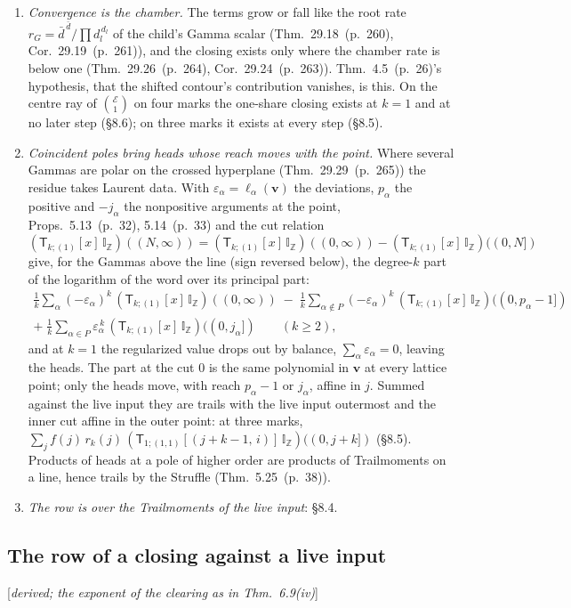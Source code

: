 \documentclass[11pt]{article}
\newcommand{\cE}{\mathcal E}
\newcommand{\sT}{\mathsf T}
\newcommand{\IZ}{\mathbb I_{\mathbb Z}}
\newcommand{\Tx}[3]{(\sT_{#1;(1)}[x]\,#2)((#3,\infty))}
\newcommand{\Th}[4]{(\sT_{#1;(1)}[x]\,#2)((#3,#4])}
\newcommand{\status}[1]{\hfill{\small[\textit{#1}]}}
\newcommand{\hb}[2]{#1~(p.~#2)}   %
\theoremstyle{plain}
\theoremstyle{remark}
\begin{document}
\begin{enumerate}[label=(\alph*)]
\item \emph{Convergence is the chamber.} The terms grow or fall like the root rate $r_G=\bar d^{\,\bar d}/\prod d_l^{\,d_l}$ of the child's Gamma scalar (Thm.~\hb{29.18}{260}, Cor.~\hb{29.19}{261}), and the closing exists only where the chamber rate is below one (Thm.~\hb{29.26}{264}, Cor.~\hb{29.24}{263}). Thm.~\hb{4.5}{26}'s hypothesis, that the shifted contour's contribution vanishes, is this. On the centre ray of $\binom{\cE}1$ on four marks the one-share closing exists at $k=1$ and at no later step (\S8.6); on three marks it exists at every step (\S8.5).
\item \emph{Coincident poles bring heads whose reach moves with the point.} Where several Gammas are polar on the crossed hyperplane (Thm.~\hb{29.29}{265}) the residue takes Laurent data. With $\varepsilon_\alpha=\ell_\alpha(\mathbf v)$ the deviations, $p_\alpha$ the positive and $-j_\alpha$ the nonpositive arguments at the point, Props.~\hb{5.13}{32}, \hb{5.14}{33} and the cut relation $\Tx{k}{\IZ}{N}=\Tx{k}{\IZ}{0}-\Th{k}{\IZ}{0}{N}$ give, for the Gammas above the line (sign reversed below), the degree-$k$ part of the logarithm of the word over its principal part:
\begin{multline*}
\frac1k\sum_{\alpha}(-\varepsilon_\alpha)^k\,\Tx{k}{\IZ}{0}\;-\;\frac1k\sum_{\alpha\notin P}(-\varepsilon_\alpha)^k\,\Th{k}{\IZ}{0}{p_\alpha-1}\\
+\;\frac1k\sum_{\alpha\in P}\varepsilon_\alpha^{\,k}\,\Th{k}{\IZ}{0}{j_\alpha}\qquad(k\ge2),
\end{multline*}
and at $k=1$ the regularized value drops out by balance, $\sum_\alpha\varepsilon_\alpha=0$, leaving the heads. The part at the cut $0$ is the same polynomial in $\mathbf v$ at every lattice point; only the heads move, with reach $p_\alpha-1$ or $j_\alpha$, affine in $j$. Summed against the live input they are trails with the live input outermost and the inner cut affine in the outer point: at three marks, $\sum_jf(j)\,r_k(j)\,(\sT_{1;(1,1)}[(j+k-1,\,i)]\,\IZ)((0,j+k])$ (\S8.5). Products of heads at a pole of higher order are products of Trailmoments on a line, hence trails by the Struffle (Thm.~\hb{5.25}{38}).
\item \emph{The row is over the Trailmoments of the live input}: \S8.4.
\end{enumerate}

\subsection{The row of a closing against a live input}\status{derived; the exponent of the clearing as in Thm.~6.9(iv)}
\end{document}
